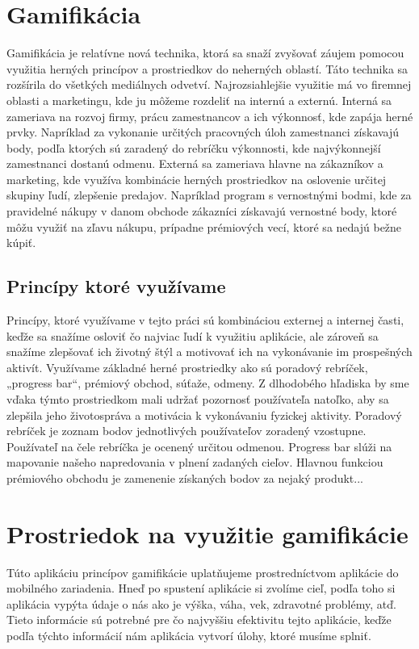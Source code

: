 \documentclass[10pt,twoside,slovak,a4paper]{article}
\begin{document}
\section{Gamifikácia} \label{Gamifikácia}

Gamifikácia je relatívne nová technika, ktorá sa snaží zvyšovať záujem pomocou využitia herných princípov a prostriedkov do neherných oblastí.\cite{Tóth:GamificationSA} Táto technika sa rozšírila do všetkých mediálnych odvetví. Najrozsiahlejšie využitie má vo firemnej oblasti a marketingu, kde ju môžeme rozdeliť na internú a externú. Interná sa zameriava na rozvoj firmy, prácu zamestnancov a ich výkonnosť, kde zapája herné prvky. Napríklad za vykonanie určitých pracovných úloh zamestnanci získavajú body, podľa ktorých sú zaradený do rebríčku výkonnosti, kde najvýkonnejší zamestnanci dostanú odmenu. Externá sa zameriava hlavne na zákazníkov a marketing, kde využíva kombinácie herných prostriedkov na oslovenie určitej skupiny ľudí, zlepšenie predajov. Napríklad program s vernostnými bodmi, kde za pravidelné nákupy v danom obchode zákazníci získavajú vernostné body, ktoré môžu využiť na zľavu nákupu, prípadne prémiových vecí, ktoré sa nedajú bežne kúpiť.  

\subsection {Princípy ktoré využívame}

Princípy, ktoré využívame v tejto práci sú kombináciou externej a internej časti, keďže sa snažíme osloviť čo najviac ľudí k využitiu aplikácie, ale zároveň sa snažíme zlepšovať ich životný štýl a motivovať ich na vykonávanie im prospešných aktivít. Využívame základné herné prostriedky ako sú poradový rebríček, „progress bar“, prémiový obchod, súťaže, odmeny. Z dlhodobého hľadiska by sme vďaka týmto prostriedkom mali udržať pozornosť používateľa natoľko, aby sa zlepšila jeho životospráva a motivácia k vykonávaniu fyzickej aktivity. Poradový rebríček je zoznam bodov jednotlivých používateľov zoradený vzostupne. Používateľ na čele rebríčka je ocenený určitou odmenou. Progress bar slúži na mapovanie našeho napredovania v plnení zadaných cieľov. Hlavnou funkciou prémiového obchodu je zamenenie získaných bodov za nejaký produkt...
\label{Gamifikácia}


\section{Prostriedok na využitie gamifikácie} \label{Využitie gamifikácie}
Túto aplikáciu princípov gamifikácie uplatňujeme prostredníctvom aplikácie do mobilného zariadenia. Hneď po spustení aplikácie si zvolíme cieľ, podľa toho si aplikácia vypýta údaje o nás ako je výška, váha, vek, zdravotné problémy, atď. Tieto informácie sú potrebné pre čo najvyššiu efektivitu tejto aplikácie, keďže podľa týchto informácií nám aplikácia vytvorí úlohy, ktoré musíme splniť. 
\end{document}
